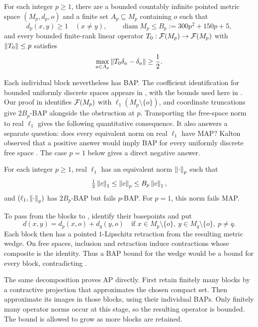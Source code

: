 \begin{theorem}\label{thm:blocks}
For each integer $p\ge1$, there are a bounded countably infinite pointed
metric space $(M_p,d_p,o)$ and a finite set $A_p\subseteq M_p$ containing
$o$ such that
\[
 d_p(x,y)\ge1\quad(x\ne y),\qquad
 \operatorname{diam}M_p\le B_p:=300p^2+150p+5,
\]
and every bounded finite-rank linear operator
$T_0:\mathcal F(M_p)\to\mathcal F(M_p)$ with $\left\|T_0\right\|\le p$ satisfies
\[
 \max_{a\in A_p}\left\|T_0\delta_a-\delta_a\right\|\ge\frac12.
\]
\end{theorem}

Each individual block nevertheless has BAP. The coefficient identification
for bounded uniformly discrete spaces appears in
\cite[Theorem~4.14]{AACD20}, with the bounds used here in
\cite[Lemma~3.4]{CuthKalenda26}. Our proof in  identifies $\mathcal F(M_p)$ with
$\ell_1(M_p\setminus\{o\})$, and coordinate truncations give
$2B_p$-BAP alongside the obstruction at $p$. Transporting the free-space
norm to real $\ell_1$ gives the following quantitative consequence. It
also answers a separate question: does every equivalent norm on real
$\ell_1$ have MAP? Kalton observed that a positive answer would imply BAP
for every uniformly discrete free space \cite[p.~1260]{Kalton12}. The case
$p=1$ below gives a direct negative answer.

\begin{corollary}\label{cor:renorming}
For each integer $p\ge1$, real $\ell_1$ has an equivalent norm
$\left\|\cdot\right\|_p$ such that
\[
 \tfrac12\left\|c\right\|_1\le\left\|c\right\|_p\le B_p\left\|c\right\|_1,
\]
and $(\ell_1,\left\|\cdot\right\|_p)$ has $2B_p$-BAP but fails $p$-BAP.
For $p=1$, this norm fails MAP.
\end{corollary}

To pass from the blocks to , identify their
basepoints and put
\[
 d(x,y)=d_p(x,o)+d_q(y,o)
 \quad\text{if }x\in M_p\setminus\{o\},\ y\in M_q\setminus\{o\},\ p\ne q.
\]
Each block then has a pointed $1$-Lipschitz retraction from the resulting
metric wedge. On free spaces, inclusion and retraction induce contractions
whose composite is the identity. Thus a BAP bound for the wedge would be
a bound for every block, contradicting .

The same decomposition proves AP directly. First retain finitely many
blocks by a contractive projection that approximates the chosen compact
set. Then approximate its images in those blocks, using their individual
BAPs. Only finitely many operator norms occur at this stage, so the
resulting operator is bounded. The bound is allowed to grow as more
blocks are retained.

